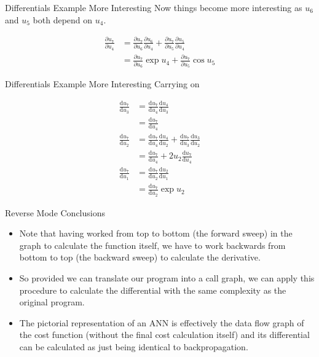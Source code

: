 \documentclass{beamer}
\begin{document}
\begin{frame}[fragile]{Differentials Example More Interesting}
Now things become more interesting as $u_6$ and $u_5$ both depend on
$u_4$.

$$
\begin{aligned}
\frac{\partial u_7}{\partial u_4} &=
 \frac{\partial u_7}{\partial u_6}\frac{\partial u_6}{\partial u_4} +
 \frac{\partial u_7}{\partial u_5}\frac{\partial u_5}{\partial u_4} \\
&= \frac{\partial u_7}{\partial u_6}\exp{u_4} +
   \frac{\partial u_7}{\partial u_5}\cos{u_5}
\end{aligned}
$$
\end{frame}

\begin{frame}[fragile]{Differentials Example More Interesting}
Carrying on

$$
\begin{aligned}
\frac{\mathrm{d}u_7}{\mathrm{d}u_3} &=
 \frac{\mathrm{d}u_7}{\mathrm{d}u_4}\frac{\mathrm{d}u_4}{\mathrm{d}u_3} \\
&= \frac{\mathrm{d}u_7}{\mathrm{d}u_4} \\
\frac{\mathrm{d}u_7}{\mathrm{d}u_2} &=
 \frac{\mathrm{d}u_7}{\mathrm{d}u_4}\frac{\mathrm{d}u_4}{\mathrm{d}u_2} +
 \frac{\mathrm{d}u_7}{\mathrm{d}u_3}\frac{\mathrm{d}u_3}{\mathrm{d}u_2} \\
&= \frac{\mathrm{d}u_7}{\mathrm{d}u_4} + 2u_2\frac{\mathrm{d}u_7}{\mathrm{d}u_4} \\
\frac{\mathrm{d}u_7}{\mathrm{d}u_1} &=
 \frac{\mathrm{d}u_7}{\mathrm{d}u_2}\frac{\mathrm{d}u_2}{\mathrm{d}u_1} \\
&=\frac{\mathrm{d}u_7}{\mathrm{d}u_2}\exp{u_2}
\end{aligned}
$$
\end{frame}

\begin{frame}[fragile]{Reverse Mode Conclusions}
\begin{itemize}
\item
Note that having worked from top to bottom (the forward sweep) in the
graph to calculate the function itself, we have to work backwards from
bottom to top (the backward sweep) to calculate the derivative.
\item
So provided we can translate our program into a call graph, we can
apply this procedure to calculate the differential with the same
complexity as the original program.
\item
The pictorial representation of an ANN is effectively the data flow
graph of the cost function (without the final cost calculation itself)
and its differential can be calculated as just being identical to
backpropagation.
\end{itemize}
\end{frame}
\end{document}
